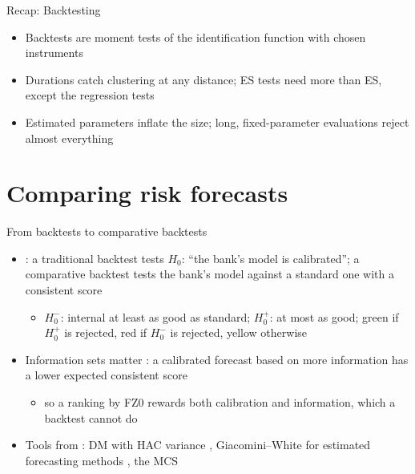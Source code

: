 \begin{frame}{Recap: Backtesting}
\itemsize{\small}
\begin{itemize}
    \item Backtests are moment tests of the identification function with chosen instruments
    \item Durations catch clustering at any distance; ES tests need more than ES, except the regression tests
    \item Estimated parameters inflate the size; long, fixed-parameter evaluations reject almost everything
\end{itemize}
\end{frame}


\section{Comparing risk forecasts}

\begin{frame}{From backtests to comparative backtests}
\itemsize{\small}
\begin{itemize}
    \item {}: a traditional backtest tests $H_0$: ``the bank's model is calibrated''; a comparative backtest tests the bank's model against a standard one with a consistent score
    \begin{itemize}
        \item $H_0^-$: internal at least as good as standard; $H_0^+$: at most as good; green if $H_0^+$ is rejected, red if $H_0^-$ is rejected, yellow otherwise
    \end{itemize}
    \item Information sets matter : a calibrated forecast based on more information has a lower expected consistent score
    \begin{itemize}
        \item so a ranking by FZ0 rewards both calibration and information, which a backtest cannot do
    \end{itemize}
    \item Tools from : DM with HAC variance , Giacomini--White for estimated forecasting methods , the MCS 
\end{itemize}
\end{frame}

